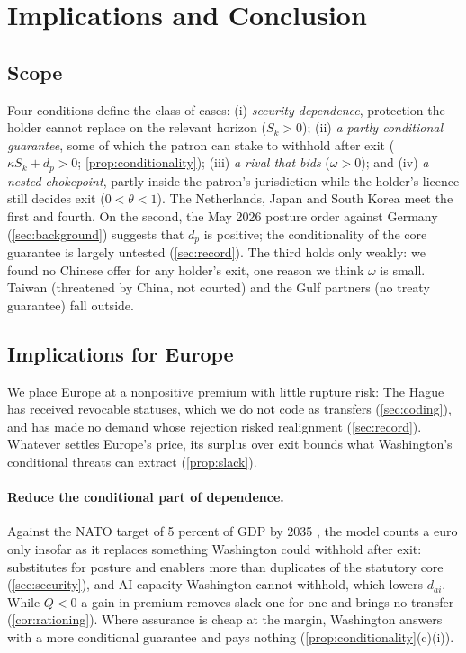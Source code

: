 \section{Implications and Conclusion}\label{sec:conclusion}

\subsection{Scope}\label{sec:scope}

Four conditions define the class of cases: (i) \emph{security dependence}, protection the holder cannot replace on the relevant horizon ($S_k>0$); (ii) \emph{a partly conditional guarantee}, some of which the patron can stake to withhold after exit ($\kappa S_k+d_p>0$; \cref{prop:conditionality}); (iii) \emph{a rival that bids} ($\omega>0$); and (iv) \emph{a nested chokepoint}, partly inside the patron's jurisdiction while the holder's licence still decides exit ($0<\theta<1$). The Netherlands, Japan and South Korea meet the first and fourth. On the second, the May 2026 posture order against Germany (\cref{sec:background}) suggests that $d_p$ is positive; the conditionality of the core guarantee is largely untested (\cref{sec:record}). The third holds only weakly: we found no Chinese offer for any holder's exit, one reason we think $\omega$ is small. Taiwan (threatened by China, not courted) and the Gulf partners (no treaty guarantee) fall outside.

\subsection{Implications for Europe}\label{sec:implications}

We place Europe at a nonpositive premium with little rupture risk: The Hague has received revocable statuses, which we do not code as transfers (\cref{sec:coding}), and has made no demand whose rejection risked realignment (\cref{sec:record}). Whatever settles Europe's price, its surplus over exit bounds what Washington's conditional threats can extract (\cref{prop:slack}).

\paragraph{Reduce the conditional part of dependence.} Against the NATO target of 5 percent of GDP by 2035 \citep{nato2025hague}, the model counts a euro only insofar as it replaces something Washington could withhold after exit: substitutes for posture and enablers more than duplicates of the statutory core (\cref{sec:security}), and AI capacity Washington cannot withhold, which lowers $d_{ai}$. While $Q<0$ a gain in premium removes slack one for one and brings no transfer (\cref{cor:rationing}). Where assurance is cheap at the margin, Washington answers with a more conditional guarantee and pays nothing (\cref{prop:conditionality}(c)(i)).

